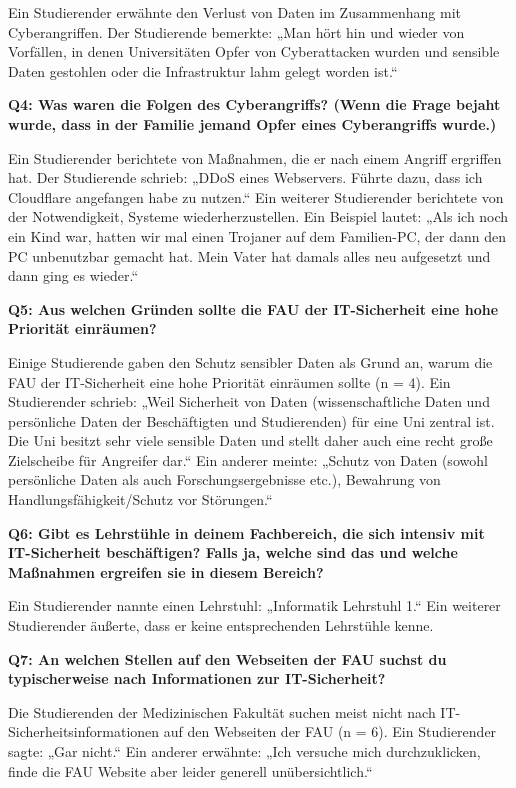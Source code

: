 \documentclass[german,report]{i1thesis}
\begin{document}
Ein Studierender erwähnte den Verlust von Daten im Zusammenhang mit Cyberangriffen. Der Studierende bemerkte: „Man hört hin und wieder von Vorfällen, in denen Universitäten Opfer von Cyberattacken wurden und sensible Daten gestohlen oder die Infrastruktur lahm gelegt worden ist.“

\textbf{Q4: Was waren die Folgen des Cyberangriffs? (Wenn die Frage bejaht wurde, dass in der Familie jemand Opfer eines Cyberangriffs wurde.)}

Ein Studierender berichtete von Maßnahmen, die er nach einem Angriff ergriffen hat. Der Studierende schrieb: „DDoS eines Webservers. Führte dazu, dass ich Cloudflare angefangen habe zu nutzen.“ Ein weiterer Studierender berichtete von der Notwendigkeit, Systeme wiederherzustellen. Ein Beispiel lautet: „Als ich noch ein Kind war, hatten wir mal einen Trojaner auf dem Familien-PC, der dann den PC unbenutzbar gemacht hat. Mein Vater hat damals alles neu aufgesetzt und dann ging es wieder.“

\textbf{Q5: Aus welchen Gründen sollte die FAU der IT-Sicherheit eine hohe Priorität einräumen?}

Einige Studierende gaben den Schutz sensibler Daten als Grund an, warum die FAU der IT-Sicherheit eine hohe Priorität einräumen sollte (n = 4). Ein Studierender schrieb: „Weil Sicherheit von Daten (wissenschaftliche Daten und persönliche Daten der Beschäftigten und Studierenden) für eine Uni zentral ist. Die Uni besitzt sehr viele sensible Daten und stellt daher auch eine recht große Zielscheibe für Angreifer dar.“ Ein anderer meinte: „Schutz von Daten (sowohl persönliche Daten als auch Forschungsergebnisse etc.), Bewahrung von Handlungsfähigkeit/Schutz vor Störungen.“

\textbf{Q6: Gibt es Lehrstühle in deinem Fachbereich, die sich intensiv mit IT-Sicherheit beschäftigen? Falls ja, welche sind das und welche Maßnahmen ergreifen sie in diesem Bereich?}

Ein Studierender nannte einen Lehrstuhl: „Informatik Lehrstuhl 1.“ Ein weiterer Studierender äußerte, dass er keine entsprechenden Lehrstühle kenne.

\textbf{Q7: An welchen Stellen auf den Webseiten der FAU suchst du typischerweise nach Informationen zur IT-Sicherheit?}

Die Studierenden der Medizinischen Fakultät suchen meist nicht nach IT-Sicherheitsinformationen auf den Webseiten der FAU (n = 6). Ein Studierender sagte: „Gar nicht.“ Ein anderer erwähnte: „Ich versuche mich durchzuklicken, finde die FAU Website aber leider generell unübersichtlich.“
\end{document}
